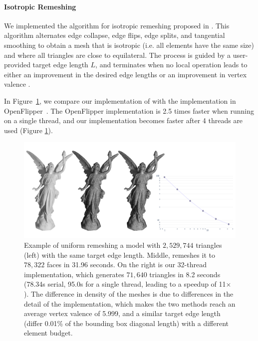 \paragraph{Isotropic Remeshing}

We implemented the  algorithm for isotropic remeshing proposed in \cite{botsch2004remeshing}. This algorithm alternates edge collapse, edge flips, edge splits, and tangential smoothing to obtain a mesh that is isotropic (i.e. all elements have the same size) and where all triangles are close to equilateral. The process is guided by a user-provided target edge length $L$, and terminates when no local operation leads to either an improvement in the desired edge lengths or an improvement in vertex valence \cite{botsch2004remeshing}.

In Figure~\ref{fig:uniform}, we compare our implementation of \cite{botsch2004remeshing} with the implementation in OpenFlipper~\cite{mobius2010openflipper}.
The OpenFlipper implementation is 2.5 times faster when running on a single thread, and our implementation becomes faster after 4 threads are used (Figure \ref{fig:uniform}).

\begin{figure}
    \centering\footnotesize
    \includegraphics[width=\linewidth]{wmtk-tex/figs/2d-remeshing-lucy.pdf}
    \caption{Example of uniform remeshing a model with $2,529,744$ triangles (left) with the same target edge length. Middle, \cite{mobius2010openflipper} remeshes it to $78,322$ faces in 31.96 seconds. On the right is our
    32-thread implementation, which generates $71,640$ triangles in 8.2 seconds (78.34s serial, 95.0s for a single thread, leading to a speedup of 11$\times$). The difference in density of the meshes is due to differences in the detail of the implementation, which makes the two methods reach an average vertex valence of 5.999, and a similar target edge length (differ 0.01\% of the bounding box diagonal length) with a different element budget.}
    \label{fig:uniform}
    
    
\end{figure}


